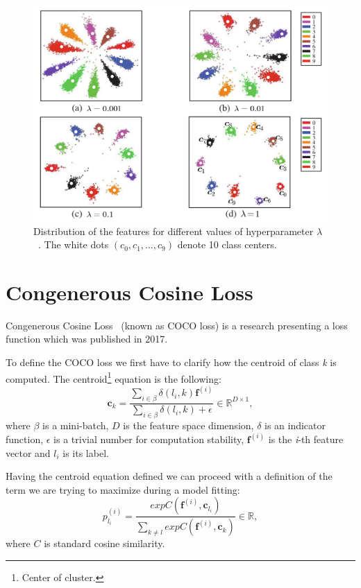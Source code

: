 \begin{figure}[H]
    \centering
    \includegraphics[width=\columnwidth]{images/face-recognition/centerlosslambda.png}
    \caption{Distribution of the features for different values of hyperparameter $\lambda$~\cite{CenterLoss}.
    The white dots $(c_0,c_1,\dots,c_9)$ denote 10 class centers.}
    \label{fig:centerlosslambda}
\end{figure}

\section{Congenerous Cosine Loss}\label{sec:coco-loss}
Congenerous Cosine Loss~\cite{CocoLoss} (known as COCO loss) is a research presenting a loss function which was
published in 2017.

To define the COCO loss we first have to clarify how the centroid of class \textit{k} is computed.
The centroid\footnote{Center of cluster.} equation is the following:
\begin{equation}
    \boldsymbol{c}_{k} = \frac{\sum_{i \in \beta} \delta \left( l_i, k \right)\boldsymbol{f}^{(i)}}
    {\sum_{i \in \beta} \delta \left( l_i, k \right) + \epsilon} \in \mathbb{R}^{D \times 1},
\end{equation}
where $\beta$ is a mini-batch, $D$ is the feature space dimension, $\delta$ is an indicator function, $\epsilon$ is a
trivial number for computation stability, $\boldsymbol{f}^{(i)}$ is the \textit{i}-th feature vector and $l_i$ is
its label.

Having the centroid equation defined we can proceed with a definition of the term we are trying to maximize during
a model fitting:
\begin{equation}
    p_{l_i}^{(i)} = \frac{exp C(\boldsymbol{f}^{(i)}, \boldsymbol{c}_{l_{i}})}
    {\sum_{k \neq l} exp C(\boldsymbol{f}^{(i)}, \boldsymbol{c}_{k})} \in \mathbb{R},
\end{equation}
where $C$ is standard cosine similarity.

